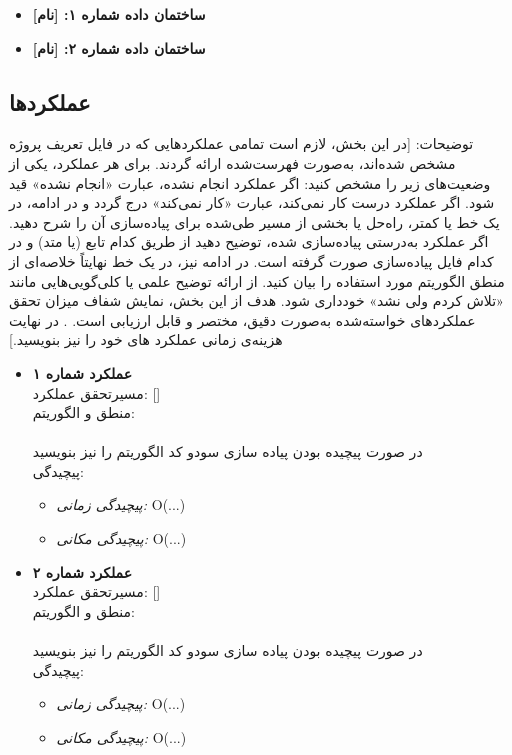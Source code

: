 \documentclass[12pt]{article}
\begin{document}
	\begin{itemize}[noitemsep]
		\item \textbf{ساختمان داده شماره ۱: [نام]}\\
		\lipsum[8]
		\item \textbf{ساختمان داده شماره ۲: [نام]}\\
		\lipsum[8]
		
	\end{itemize}

 
	\newpage
	
\subsection{عملکرد‌ها}
توضیحات: [در این بخش، لازم است تمامی عملکردهایی که در فایل تعریف پروژه مشخص شده‌اند، به‌صورت فهرست‌شده ارائه گردند. برای هر عملکرد، یکی از وضعیت‌های زیر را مشخص کنید:
اگر عملکرد انجام نشده، عبارت «انجام نشده» قید شود.
اگر عملکرد درست کار نمی‌کند، عبارت «کار نمی‌کند» درج گردد و در ادامه، در یک خط یا کمتر، راه‌حل یا بخشی از مسیر طی‌شده برای پیاده‌سازی آن را شرح دهید.
اگر عملکرد به‌درستی پیاده‌سازی شده، توضیح دهید از طریق کدام تابع (یا متد) و در کدام فایل پیاده‌سازی صورت گرفته است. در ادامه نیز، در یک خط نهایتاً خلاصه‌ای از منطق الگوریتم مورد استفاده را بیان کنید.
از ارائه توضیح علمی یا کلی‌گویی‌هایی مانند «تلاش کردم ولی نشد» خودداری شود. هدف از این بخش، نمایش شفاف میزان تحقق عملکردهای خواسته‌شده به‌صورت دقیق، مختصر و قابل ارزیابی است.
. در نهایت هزینه‌ی زمانی عملکرد های خود را نیز بنویسید.]\\

\begin{itemize}[noitemsep]
	\item \textbf{عملکرد شماره ۱}\\
	مسیرتحقق عملکرد: []
\\

 	منطق و الگوریتم:
\\
	\lipsum[9]
	\\[0.2cm]
	در صورت پیچیده بودن پیاده سازی سودو کد الگوریتم را نیز بنویسید\\[0.2cm]
	پیچیدگی:
	\begin{itemize}[noitemsep]
		\item \textit{پیچیدگی زمانی:} O(...)
		\item \textit{پیچیدگی مکانی:} O(...)
	\end{itemize}		
		\item \textbf{عملکرد شماره ۲}\\
	مسیرتحقق عملکرد: []
\\

 	منطق و الگوریتم:
\\
	\lipsum[9]
	\\[0.2cm]
	در صورت پیچیده بودن پیاده سازی سودو کد الگوریتم را نیز بنویسید\\[0.2cm]
	پیچیدگی:
	\begin{itemize}[noitemsep]
		\item \textit{پیچیدگی زمانی:} O(...)
		\item \textit{پیچیدگی مکانی:} O(...)
	\end{itemize}	
\end{itemize}
	
\end{document}
